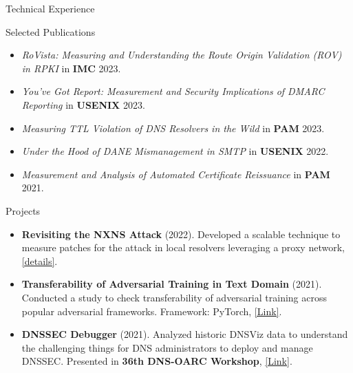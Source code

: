 \documentclass[]{mcdowellcv}
\begin{document}
	\begin{cvsection}{Technical Experience}
		\begin{cvsubsection}{Selected Publications}{}{}
			\begin{itemize}
				\item \textit{RoVista: Measuring and Understanding the Route Origin Validation (ROV) in RPKI} in \textbf{IMC} 2023. %
				\item \textit{You’ve Got Report: Measurement and Security Implications of DMARC Reporting} in \textbf{USENIX} 2023. %
				\item \textit{Measuring TTL Violation of DNS Resolvers in the Wild} in \textbf{PAM} 2023. %
				\item \textit{Under the Hood of DANE Mismanagement in SMTP} in \textbf{USENIX} 2022. %
				\item \textit{Measurement and Analysis of Automated Certificate Reissuance} in \textbf{PAM} 2021.
			\end{itemize}
		\end{cvsubsection}
		\begin{cvsubsection}{Projects}{}{}
			\begin{itemize}
				\item \textbf{Revisiting the NXNS Attack} (2022). Developed a scalable technique to measure patches for the attack in local resolvers leveraging a proxy network, \href{https://drive.google.com/file/d/1kuTSIHuNUYxmIKbR6MsSg3znMqx55mCP/view}{[details]}.
				\item \textbf{Transferability of Adversarial Training in Text Domain} (2021). Conducted a study to check transferability of adversarial training across popular adversarial frameworks. Framework: PyTorch, \href{https://github.com/Ashiq5/AdvTrainingExperiment}{[Link]}.
				\item \textbf{DNSSEC Debugger} (2021).  Analyzed historic DNSViz data to understand the challenging things for DNS administrators to deploy and manage DNSSEC. Presented in \textbf{36th DNS-OARC Workshop}, \href{https://indico.dns-oarc.net/event/40/contributions/891/attachments/857/1555/DNS-OARC-final.pdf}{[Link]}.
			\end{itemize}
		\end{cvsubsection}
	\end{cvsection}
	
\end{document}
